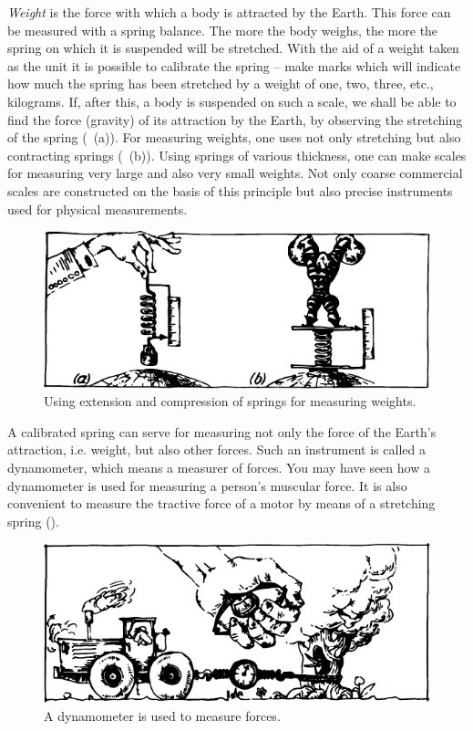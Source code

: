 \emph{Weight} is the force with which a body is attracted by
the Earth. This force can be measured with a spring
balance. The more the body weighs, the more the spring
on which it is suspended will be stretched. With the aid
of a weight taken as the unit it is possible to calibrate
the spring -- make marks which will indicate how much
the spring has been stretched by a weight of one, two,
three, etc., kilograms. If, after this, a body is suspended
on such a scale, we shall be able to find the force (gravity)
of its attraction by the Earth, by observing the stretching of the spring (~{\textcolor{black!70}{(a)}}). For measuring weights, one uses not only stretching but also contracting springs
 (~{\textcolor{black!70}{(b)}}). Using springs of various thickness, one
can make scales for measuring very large and also very
small weights. Not only coarse commercial scales are
constructed on the basis of this principle but also precise
instruments used for physical measurements.
\begin{figure}[!ht]
\centering
\includegraphics[width=\textwidth]{figures/fig-01-01.pdf}
\caption{Using extension and compression of springs for measuring weights.}
\label{fig-1.1}
\end{figure}
A calibrated spring can serve for measuring not only the force of the
Earth's attraction, i.e. weight, but also other forces. Such an
instrument is called a dynamometer, which means a measurer of
forces. You may have seen how a dynamometer is used for measuring a
person's muscular force. It is also convenient to measure the tractive
force of a motor by means of a stretching spring ().
\begin{figure}[!ht]
\centering
\includegraphics[width=\textwidth]{figures/fig-01-02.pdf}
\caption{A dynamometer is used to measure forces.}
\label{fig-1.2}
\end{figure}

